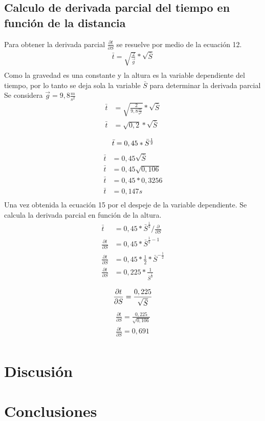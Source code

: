 \documentclass[runningheads]{llncs}
\begin{document}
    \subsection{Calculo de derivada parcial del tiempo en función de la distancia}
    Para obtener la derivada parcial $\frac{\partial t}{\partial S}$ se resuelve por medio de la ecuación 12.
    \begin{align*}
        \bar{t}=\sqrt{\frac{2}{\overrightarrow{g}}}*\sqrt{\bar{S}}\\
    \end{align*}
    Como la gravedad es una constante y la altura es la variable dependiente del tiempo, por lo tanto se deja sola la variable $\bar{S}$ para determinar la derivada parcial\\
    Se considera $\vec{g}=9,8 \frac{m}{{s}^{2}}$
    \begin{align*}
        \bar{t} & =\sqrt{\frac{2}{{9,8 \frac{m}{{s}^{2}}}}}*\sqrt{\bar{S}}\\
        \bar{t} & =\sqrt{0,2}*\sqrt{\bar{S}}\\ 
    \end{align*}
    \begin{equation}
        \bar{t} =0,45*\bar{S}^{\frac{1}{2}}\\
    \end{equation}
    \begin{align*}
        \bar{t} &=0,45\sqrt{\bar{S}}\\
        \bar{t} &=0,45\sqrt{0,106}\\
        \bar{t} &=0,45*0,3256\\
        \bar{t} &=0,147 s \tag{M}\\
    \end{align*}
    Una vez obtenida la ecuación 15 por el despeje de la variable dependiente. Se calcula la derivada parcial en función de la altura. 
    \begin{align*}
        \bar{t}                          & = 0,45*\bar{S}^{\frac{1}{2}} / \frac{\partial}{\partial S} \\
        \frac{\partial t}{\partial S}    & = 0,45*\bar{S}^{\frac{1}{2}-1}\\
        \frac{\partial t}{\partial S}    & = 0,45*\frac{1}{2}*\bar{S}^{-\frac{1}{2}}\\
        \frac{\partial t}{\partial S}    & = 0,225*\frac{1}{\bar{S}^{\frac{1}{2}}}\\
    \end{align*}
    \begin{equation}
        \frac{\partial t}{\partial S}      = \frac{0,225}{\sqrt{\bar{S}}}\\
    \end{equation}
    \begin{align*}
        \frac{\partial t}{\partial S} = \frac{0,225}{\sqrt{0,106}}\\
        \frac{\partial t}{\partial S} = 0,691 \tag{N}\\
    \end{align*}
    \section{Discusión}
    \section{Conclusiones}

\printbibliography
\end{document}

